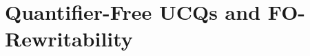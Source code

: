 \documentclass{lmcs}
\theoremstyle{definition}
\begin{document}




\section{Quantifier-Free UCQs and FO-Rewritability}
\label{sect:fullq}
%
\end{document}
